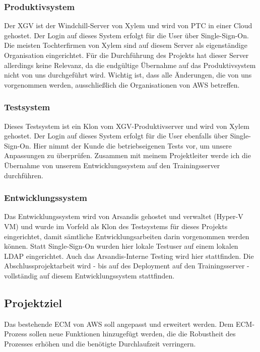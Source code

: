 \subsubsection*{Produktivsystem}
Der \acl{XGV} ist der Windchill-Server von Xylem und wird von PTC in einer Cloud gehostet.
Der Login auf dieses System erfolgt für die User über Single-Sign-On.
Die meisten Tochterfirmen von Xylem sind auf diesem Server als eigenständige Organisation eingerichtet.
Für die Durchführung des Projekts hat dieser Server allerdings keine Relevanz, da die endgültige Übernahme auf das Produktivsystem nicht von uns durchgeführt wird.
Wichtig ist, dass alle Änderungen, die von uns vorgenommen werden, ausschließlich die Organisationen von \ac{AWS} betreffen.

\subsubsection*{Testsystem}
Dieses Testsystem ist ein Klon vom \ac{XGV}-Produktivserver und wird von Xylem gehostet.
Der Login auf dieses System erfolgt für die User ebenfalls über Single-Sign-On.
Hier nimmt der Kunde die betriebseigenen Tests vor, um unsere Anpassungen zu überprüfen.
Zusammen mit meinem Projektleiter werde ich die Übernahme von unserem Entwicklungssystem auf den Trainingsserver durchführen.

\subsubsection*{Entwicklungssystem}
Das Entwicklungssystem wird von Arsandis gehostet und verwaltet (Hyper-V VM) und wurde im Vorfeld als Klon des Testsystems für dieses Projekts eingerichtet, damit sämtliche Entwicklungsarbeiten darin vorgenommen werden können.
Statt Single-Sign-On wurden hier lokale Testuser auf einem lokalen LDAP eingerichtet.
Auch das Arsandis-Interne Testing wird hier stattfinden.
Die Abschlussprojektarbeit wird - bis auf des Deployment auf den Trainingsserver - vollständig auf diesem Entwicklungssystem stattfinden.

\subsection{Projektziel} 
\label{sec:Projektziel}
Das bestehende \ac{ECM} von \ac{AWS} soll angepasst und erweitert werden.
Dem \ac{ECM}-Prozess sollen neue Funktionen hinzugefügt werden, die die Robustheit des Prozesses erhöhen und die benötigte Durchlaufzeit verringern.

